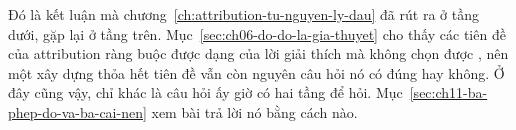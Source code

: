 Đó là kết luận mà chương~\ref{ch:attribution-tu-nguyen-ly-dau} đã rút ra ở tầng
dưới, gặp lại ở tầng trên. Mục~\ref{sec:ch06-do-do-la-gia-thuyet} cho thấy các
tiên đề của attribution ràng buộc được dạng của lời giải thích mà không chọn
được , nên một xây dựng thỏa hết tiên đề vẫn còn nguyên câu hỏi nó có đúng
hay không. Ở đây cũng vậy, chỉ khác là câu hỏi ấy giờ có hai tầng để hỏi.
Mục~\ref{sec:ch11-ba-phep-do-va-ba-cai-nen} xem bài trả lời nó bằng cách nào.
%
